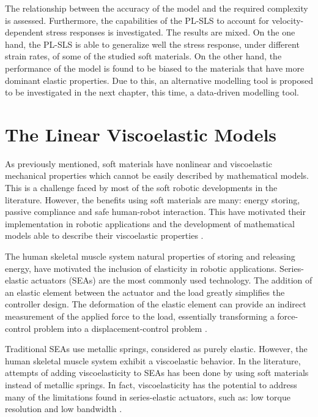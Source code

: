 The relationship between the accuracy of the model and the required complexity is assessed. Furthermore, the capabilities of the PL-SLS to account for velocity-dependent stress responses is investigated. The results are mixed. On the one hand, the PL-SLS is able to generalize well the stress response, under different strain rates, of some of the studied soft materials. On the other hand, the performance of the model is found to be biased to the materials that have more dominant elastic properties. Due to this, an alternative modelling tool is proposed to be investigated in the next chapter, this time, a data-driven modelling tool.

\section{The Linear Viscoelastic Models}

As previously mentioned, soft materials have nonlinear and viscoelastic mechanical properties which cannot be easily described by mathematical models. This is a challenge faced by most of the soft robotic developments in the literature. However, the benefits using soft materials are many: energy storing, passive compliance and safe human-robot interaction. This have motivated their implementation in robotic applications and the development of mathematical models able to describe their viscoelastic properties \cite{lee2017soft}.

The human skeletal muscle system natural properties of storing and releasing energy, have motivated the inclusion of elasticity in robotic applications. Series-elastic actuators (SEAs) are the most commonly used technology. The addition of an elastic element between the actuator and the load greatly simplifies the controller design. The deformation of the elastic element can provide an indirect measurement of the applied force to the load, essentially transforming a force-control problem into a displacement-control problem \cite{agarwal2017series}. 

Traditional SEAs use metallic springs, considered as purely elastic. However, the human skeletal muscle system exhibit a viscoelastic behavior. In the literature, attempts of adding viscoelasticity to SEAs has been done by using soft materials instead of metallic springs. In fact, viscoelasticity has the potential to address many of the limitations found in series-elastic actuators, such as: low torque resolution and low bandwidth \cite{martins2015polyurethane,tagliamonte2014rendering,schepelmann2014compact}. 

